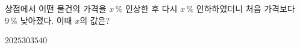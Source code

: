 상점에서 어떤 물건의 가격을 $x\,\%$ 인상한 후 다시 $x\,\%$ 인하하였더니 처음 가격보다 $9\,\%$ 낮아졌다. 이때 $x$의 값은? 
\begin{choices32}{$20$}{$25$}{$30$}{$35$}{$40$}\end{choices32}
